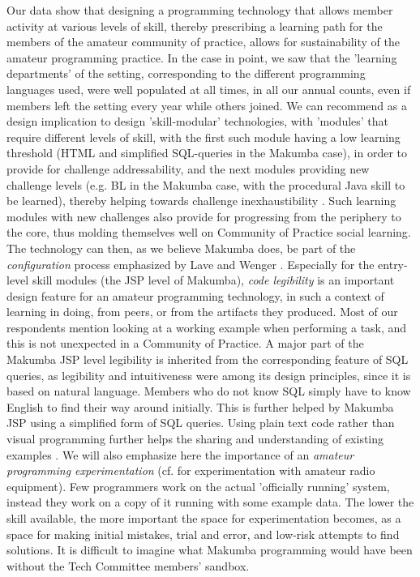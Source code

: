 \documentclass{acm_proc_article-sp}
\begin{document}
Our data show that designing a programming technology that allows member activity at various levels of skill, thereby prescribing a learning path for the members of the amateur community of practice, allows for sustainability of the amateur programming practice. In the case in point, we saw that the 'learning departments' of the setting, corresponding to the different programming languages used, were well populated at all times, in all our annual counts,  even if members left the setting every year while others joined. We can recommend as a design implication to design 'skill-modular' technologies, with 'modules' that require different levels of skill, with the first such module having a low learning threshold (HTML and simplified SQL-queries in the Makumba case), in order to provide for challenge addressability, and the next modules providing new challenge levels (e.g. BL in the Makumba case, with the procedural Java skill to be learned), thereby helping towards challenge inexhaustibility \cite{bogdan_bowers07}. Such learning modules with new challenges also provide for progressing from the periphery to the core, thus molding themselves well on Community of Practice social learning. The technology can then, as we believe Makumba does, be part of the \textit{configuration} process emphasized by Lave and Wenger \cite{lave_wenger91}. Especially for the entry-level skill modules (the JSP level of Makumba), \textit{code legibility} is an important design feature for an amateur programming technology, in such a context of learning in doing, from peers, or from the artifacts they produced. Most of our respondents mention looking at a working example when performing a task, and this is not unexpected in a Community of Practice. A major part of the Makumba JSP level legibility is inherited from the corresponding feature of SQL queries, as legibility and intuitiveness were among its design principles, since it is based on natural language. Members who do not know SQL simply have to know English to find their way around initially. This is further helped by Makumba JSP using a simplified form of SQL queries. Using plain text code rather than visual programming further helps the sharing and understanding of existing examples \cite{yamauchi00}. We will also emphasize here the importance of an \textit{amateur programming experimentation} (cf.  \cite{bogdan_bowers07} for experimentation with amateur radio equipment). Few programmers work on the actual 'officially running' system, instead they work on a copy of it running with some example data. The lower the skill available, the more important the space for experimentation becomes, as a space for making initial mistakes, trial and error, and low-risk attempts to find solutions. It is difficult to imagine what Makumba programming would have been without the Tech Committee members' sandbox.
\end{document}
